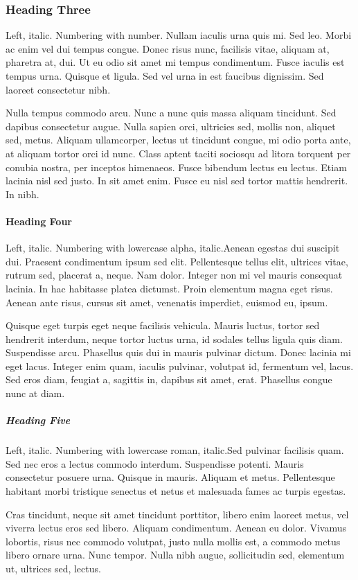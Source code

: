 \documentclass[titlepage,11pt]{lawessay}
\begin{document}
\subsubsection{Heading Three}Left, italic. Numbering with number.
Nullam iaculis urna quis mi. Sed leo. Morbi ac enim vel dui tempus congue. Donec risus nunc, facilisis vitae, aliquam at, pharetra at, dui. Ut eu odio sit amet mi tempus condimentum. Fusce iaculis est tempus urna. Quisque et ligula. Sed vel urna in est faucibus dignissim. Sed laoreet consectetur nibh.

Nulla tempus commodo arcu. Nunc a nunc quis massa aliquam tincidunt. Sed dapibus consectetur augue. Nulla sapien orci, ultricies sed, mollis non, aliquet sed, metus. Aliquam ullamcorper, lectus ut tincidunt congue, mi odio porta ante, at aliquam tortor orci id nunc. Class aptent taciti sociosqu ad litora torquent per conubia nostra, per inceptos himenaeos. Fusce bibendum lectus eu lectus. Etiam lacinia nisl sed justo. In sit amet enim. Fusce eu nisl sed tortor mattis hendrerit. In nibh. 

\paragraph{Heading Four}Left, italic. Numbering with lowercase alpha, italic.Aenean egestas dui suscipit dui. Praesent condimentum ipsum sed elit. Pellentesque tellus elit, ultrices vitae, rutrum sed, placerat a, neque. Nam dolor. Integer non mi vel mauris consequat lacinia. In hac habitasse platea dictumst. Proin elementum magna eget risus. Aenean ante risus, cursus sit amet, venenatis imperdiet, euismod eu, ipsum. 

Quisque eget turpis eget neque facilisis vehicula. Mauris luctus, tortor sed hendrerit interdum, neque tortor luctus urna, id sodales tellus ligula quis diam. Suspendisse arcu. Phasellus quis dui in mauris pulvinar dictum. Donec lacinia mi eget lacus. Integer enim quam, iaculis pulvinar, volutpat id, fermentum vel, lacus. Sed eros diam, feugiat a, sagittis in, dapibus sit amet, erat. Phasellus congue nunc at diam.

\subparagraph{Heading Five}Left, italic. Numbering with lowercase roman, italic.Sed pulvinar facilisis quam. Sed nec eros a lectus commodo interdum. Suspendisse potenti. Mauris consectetur posuere urna. Quisque in mauris. Aliquam et metus. Pellentesque habitant morbi tristique senectus et netus et malesuada fames ac turpis egestas. 

Cras tincidunt, neque sit amet tincidunt porttitor, libero enim laoreet metus, vel viverra lectus eros sed libero. Aliquam condimentum. Aenean eu dolor. Vivamus lobortis, risus nec commodo volutpat, justo nulla mollis est, a commodo metus libero ornare urna. Nunc tempor. Nulla nibh augue, sollicitudin sed, elementum ut, ultrices sed, lectus. 
\end{document}
